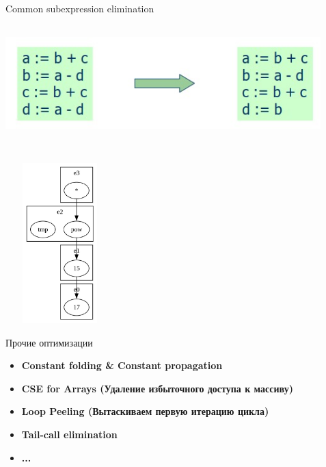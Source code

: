 \documentclass[aspectratio=169
  , xcolor={svgnames}
  , russian  %
  ]{beamer}
\begin{document}
\begin{frame}{Common subexpression elimination}
    \centering
    \includegraphics[width=12.2cm, height=5.2cm]{misc/egraphs_images/cse.jpeg}
\end{frame}

\begin{frame}{}
    \centering
    \includegraphics[width=4.2cm, height=6.2cm]{misc/egraphs_images/cse_demo.jpeg}
\end{frame}

\begin{frame}{Прочие оптимизации}
    \begin{itemize}
    \item \textbf{\fontsize{14.1}{12} Constant folding \& Constant propagation }
    \newline
    \item \textbf{\fontsize{14.1}{12} CSE for Arrays (Удаление избыточного доступа к массиву) }
    \newline
    \item \textbf{\fontsize{14.1}{12}  Loop Peeling (Вытаскиваем первую итерацию цикла)} 
    \newline
    \item \textbf{\fontsize{14.1}{12}  Tail-call elimination}
    \newline
    \item \textbf{\fontsize{14.1}{12}  ...}
    \newline
    \end{itemize}
\end{frame}
\end{document}
